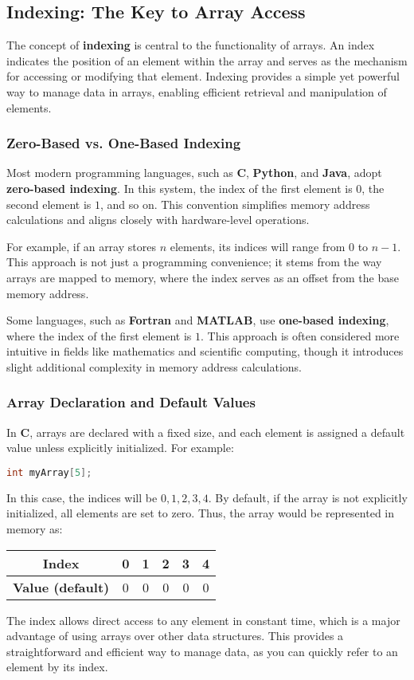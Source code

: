 \documentclass[12pt, oneside]{book}
\begin{document}
	\subsection{Indexing: The Key to Array Access}
	The concept of \textbf{indexing} is central to the functionality of arrays. An index indicates the position of an element within the array and serves as the mechanism for accessing or modifying that element. Indexing provides a simple yet powerful way to manage data in arrays, enabling efficient retrieval and manipulation of elements.
	
	\subsubsection{Zero-Based vs. One-Based Indexing}
	Most modern programming languages, such as \textbf{C}, \textbf{Python}, and \textbf{Java}, adopt \textbf{zero-based indexing}. In this system, the index of the first element is \(0\), the second element is \(1\), and so on. This convention simplifies memory address calculations and aligns closely with hardware-level operations.
	
	For example, if an array stores \(n\) elements, its indices will range from \(0\) to \(n-1\). This approach is not just a programming convenience; it stems from the way arrays are mapped to memory, where the index serves as an offset from the base memory address.
	
	Some languages, such as \textbf{Fortran} and \textbf{MATLAB}, use \textbf{one-based indexing}, where the index of the first element is \(1\). This approach is often considered more intuitive in fields like mathematics and scientific computing, though it introduces slight additional complexity in memory address calculations.
	
	\subsubsection{Array Declaration and Default Values}
	In \textbf{C}, arrays are declared with a fixed size, and each element is assigned a default value unless explicitly initialized. For example:
	
	\begin{lstlisting}[language=C]
		int myArray[5];
	\end{lstlisting}
	
	In this case, the indices will be \(0, 1, 2, 3, 4\). By default, if the array is not explicitly initialized, all elements are set to zero. Thus, the array would be represented in memory as:
	\begin{table}[ht]
		\centering
		\begin{tabular}{|c|c|c|c|c|c}
			\hline
			\textbf{Index} & 0 & 1 & 2 & 3 & 4 \\ 
			\hline
			\textbf{Value (default)} & 0 & 0 & 0 & 0&0 \\ 
			\hline
		\end{tabular}
	\end{table}
	The index allows direct access to any element in constant time, which is a major advantage of using arrays over other data structures. This provides a straightforward and efficient way to manage data, as you can quickly refer to an element by its index.
\end{document}
